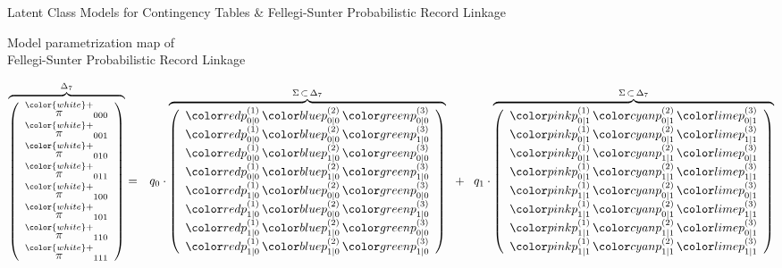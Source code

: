 \begin{frame}{\Large \vskip -0.3cm Latent Class Models for Contingency Tables \&\vskip 0.1cm Fellegi-Sunter Probabilistic Record Linkage}
\end{frame}
\normalsize

\begin{frame}{\vskip -0.35cm \Large Model parametrization map of\\ Fellegi-Sunter Probabilistic Record Linkage}

\vskip -0.35cm

\tiny

\begin{eqnarray*}
	\overset{\Delta_{7}}{\overbrace{
	\left(\begin{array}{c}
	\overset{{\color{white}+}}{\pi}_{000} \\
	\overset{{\color{white}+}}{\pi}_{001} \\
	\overset{{\color{white}+}}{\pi}_{010} \\
	\overset{{\color{white}+}}{\pi}_{011} \\
	\overset{{\color{white}+}}{\pi}_{100} \\
	\overset{{\color{white}+}}{\pi}_{101} \\
	\overset{{\color{white}+}}{\pi}_{110} \\
	\overset{{\color{white}+}}{\pi}_{111} \\
	\end{array}\right)
	}}
& = &
q_{0} \cdot
	\overset{\Sigma\,\subset\,\Delta_{7}}{\overbrace{
	\left(\begin{array}{c}
	\pozz\,\ptzz\,\phzz \\
	\pozz\,\ptzz\,\phoz \\
	\pozz\,\ptoz\,\phzz \\ 
	\pozz\,\ptoz\,\phoz \\
	\pooz\,\ptzz\,\phzz \\
	\pooz\,\ptzz\,\phoz \\
	\pooz\,\ptoz\,\phzz \\
	\pooz\,\ptoz\,\phoz
	\end{array}\right)
	}}
\;\; + \;\;
q_{1} \cdot
	\overset{\Sigma\,\subset\,\Delta_{7}}{\overbrace{
	\left(\begin{array}{c}
	\pozo\,\ptzo\,\phzo \\
	\pozo\,\ptzo\,\phoo \\
	\pozo\,\ptoo\,\phzo \\
	\pozo\,\ptoo\,\phoo \\
	\pooo\,\ptzo\,\phzo \\
	\pooo\,\ptzo\,\phoo \\
	\pooo\,\ptoo\,\phzo \\
	\pooo\,\ptoo\,\phoo
	\end{array}\right)
	}}
\end{eqnarray*}


\end{frame}
